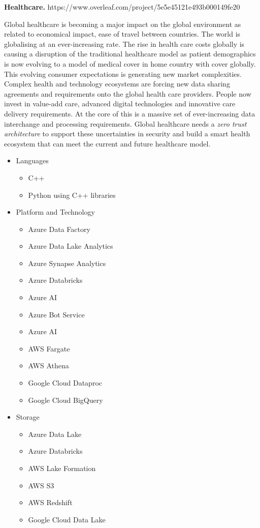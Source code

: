 \begin{Workpackage}{\thewpno}
\begin{Task}
\textbf{Healthcare.} https://www.overleaf.com/project/5e5e45121e493b000149fe20

Global healthcare is becoming a major impact on the global environment as related to economical impact, ease of travel between countries. The world is globalising at an ever-increasing rate. The rise in health care costs globally is causing a disruption of the traditional healthcare model as patient demographics is now evolving to a model of medical cover in home country with cover globally. This evolving consumer expectations is generating new market complexities. Complex health and technology ecosystems are forcing new data sharing agreements and requirements onto the global health care providers. People now invest in value-add care, advanced digital technologies and innovative care delivery requirements. At the core of this is a massive set of ever-increasing data interchange and processing requirements. Global healthcare needs a \emph{zero trust architecture} to support these uncertainties in security and build a smart health ecosystem that can meet the current and future healthcare model.

\begin{itemize}
    \item Languages
        \begin{itemize}
            \item C++
            \item Python using C++ libraries
        \end{itemize}
    \item Platform and Technology
        \begin{itemize}
            \item Azure Data Factory
            \item Azure Data Lake Analytics
            \item Azure Synapse Analytics
            \item Azure Databricks
            \item Azure AI
            \item Azure Bot Service
            \item Azure AI
            \item AWS Fargate
            \item AWS Athena
            \item Google Cloud Dataproc
            \item Google Cloud BigQuery
        \end{itemize}
    \item Storage
        \begin{itemize}
            \item Azure Data Lake
            \item Azure Databricks
            \item AWS Lake Formation
            \item AWS S3
            \item AWS Redshift
            \item Google Cloud Data Lake
        \end{itemize}
\end{itemize}


\end{Task}
\end{Workpackage}
